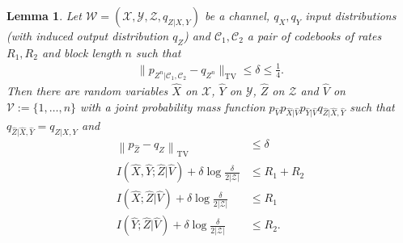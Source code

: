 \documentclass[journal]{IEEEtran}
\newcommand{\lemmaconst}{\delta}
\newcommand{\channelpmf}{q}
\newcommand{\codebookpmf}{p}
\newcommand{\codebookRateOne}{R_1}
\newcommand{\codebookRateTwo}{R_2}
\newcommand{\channelInOne}{X}
\newcommand{\channelInOneAlph}{\mathcal{X}}
\newcommand{\channelInTwo}{Y}
\newcommand{\channelInTwoAlph}{\mathcal{Y}}
\newcommand{\channelOut}{Z}
\newcommand{\channelOutAlph}{\mathcal{Z}}
\newcommand{\channel}{\mathcal{W}}
\newcommand{\codebookOne}{\mathcal{C}_1}
\newcommand{\codebookTwo}{\mathcal{C}_2}
\newcommand{\codebookBlocklength}{n}
\newcommand{\mutualInformationConditional}[3]{I(#1;#2|#3)}
\newcommand{\totalvariation}[1]{\lVert #1 \rVert_\mathrm{TV}}
\newcommand{\totalvariationlr}[1]{\left\lVert #1 \right\rVert_\mathrm{TV}}
\newcommand{\cardinality}[1]{\lvert #1 \rvert}
\newcommand{\timeSharingRV}{V}
\newcommand{\timeSharingAlph}{\mathcal{V}}
\newtheorem{lemma}{Lemma}
\begin{document}
\begin{lemma}
\label{converse-lemma}
Let $\channel = (\channelInOneAlph, \channelInTwoAlph, \channelOutAlph, \channelpmf_{\channelOut | \channelInOne, \channelInTwo})$ be a channel, $\channelpmf_\channelInOne, \channelpmf_\channelInTwo$ input distributions (with induced output distribution $\channelpmf_\channelOut$) and $\codebookOne, \codebookTwo$ a pair of codebooks of rates $\codebookRateOne, \codebookRateTwo$ and block length $\codebookBlocklength$ such that
\begin{align} 
\label{converse-lemma-tvassumption}
\totalvariation{\codebookpmf_{\channelOut^\codebookBlocklength | \codebookOne, \codebookTwo} - \channelpmf_{\channelOut^\codebookBlocklength}} \leq \lemmaconst \leq \frac{1}{4}.
\end{align}
Then there are random variables $\hat{\channelInOne}$ on $\channelInOneAlph$, $\hat{\channelInTwo}$ on $\channelInTwoAlph$, $\hat{\channelOut}$ on $\channelOutAlph$ and $\hat{\timeSharingRV}$ on $\timeSharingAlph :=  \{1,\dots, \codebookBlocklength\}$ with a joint probability mass function $\codebookpmf_{\hat{\timeSharingRV}} \codebookpmf_{\hat{\channelInOne} | \hat{\timeSharingRV}} \codebookpmf_{\hat{\channelInTwo} | \hat{\timeSharingRV}} \channelpmf_{\hat{\channelOut} | \hat{\channelInOne}, \hat{\channelInTwo}}$ such that $\channelpmf_{\hat{\channelOut} | \hat{\channelInOne}, \hat{\channelInTwo}} = \channelpmf_{\channelOut | \channelInOne, \channelInTwo}$ and
\begin{align}
\label{converse-lemma-convergence}
\totalvariationlr{\codebookpmf_{\hat{\channelOut}} - \channelpmf_{\channelOut}}
&\leq
\lemmaconst
\\
\label{converse-lemma-sumrate}
\mutualInformationConditional{\hat{\channelInOne}, \hat{\channelInTwo}}{\hat{\channelOut}}{\hat{\timeSharingRV}}
+
\lemmaconst
\log
\frac{\lemmaconst}{2\cardinality{\channelOutAlph}}
&\leq
\codebookRateOne + \codebookRateTwo
\\
\label{converse-lemma-rateone}
\mutualInformationConditional{\hat{\channelInOne}}{\hat{\channelOut}}{\hat{\timeSharingRV}}
+
\lemmaconst
\log
\frac{\lemmaconst}{2\cardinality{\channelOutAlph}}
&\leq
\codebookRateOne
\\
\label{converse-lemma-ratetwo}
\mutualInformationConditional{\hat{\channelInTwo}}{\hat{\channelOut}}{\hat{\timeSharingRV}}
+
\lemmaconst
\log
\frac{\lemmaconst}{2\cardinality{\channelOutAlph}}
&\leq
\codebookRateTwo.
\end{align}
\end{lemma}
\end{document}
